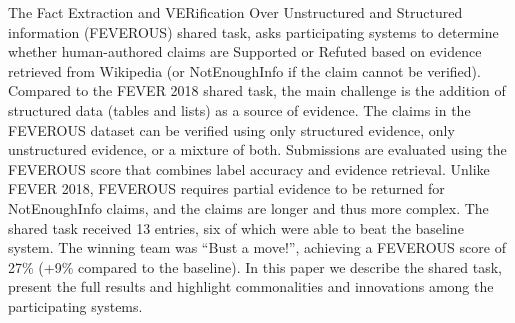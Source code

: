 The Fact Extraction and VERification Over Unstructured and Structured information (FEVEROUS) shared task, asks participating systems to determine whether human-authored claims are Supported or Refuted based on evidence retrieved from Wikipedia (or NotEnoughInfo if the claim cannot be verified). Compared to the FEVER 2018 shared task, the main challenge is the addition of structured data (tables and lists) as a source of evidence. The claims in the FEVEROUS dataset can be verified using only structured evidence, only unstructured evidence, or a mixture of both. Submissions are evaluated using the FEVEROUS score that combines label accuracy and evidence retrieval. Unlike FEVER 2018, FEVEROUS requires partial evidence to be returned for NotEnoughInfo claims, and the claims are longer and thus more complex. The shared task received 13 entries, six of which were able to beat the baseline system. The winning team was ``Bust a move!'', achieving a FEVEROUS score of 27\% (+9\% compared to the baseline). In this paper we describe the shared task, present the full results and highlight commonalities and innovations among the participating systems.
